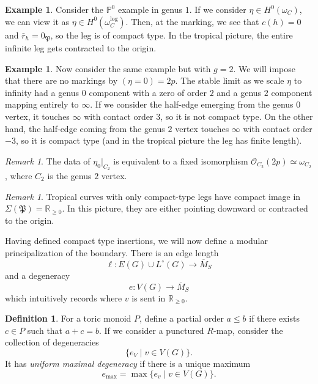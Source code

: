 \documentclass[10pt]{amsart}
\theoremstyle{definition}
\newtheorem{defn}[thm]{Definition}
\newtheorem{exm}[thm]{Example}
\theoremstyle{remark}
\newtheorem{rmk}[thm]{Remark}
\theoremstyle{plain}
\theoremstyle{definition}
\theoremstyle{remark}
\newcommand{\R}{\mathbb{R}}
\renewcommand{\P}{\mathbb{P}}
\newcommand{\mc}[1]{\mathcal{#1}}
\newcommand{\mf}[1]{\mathfrak{#1}}
\newcommand{\ol}[1]{\overline{#1}}
\newcommand{\1}{\mathbf{1}}
\newcommand{\2}{\mathbf{2}}
\newcommand{\3}{\mathbf{3}}
\begin{document}
\begin{exm}
    Consider the $\P^0$ example in genus $1$. If we consider $\eta \in H^0(\omega_C)$, we can view it as $\eta \in H^0(\omega_C^{\log})$. Then, at the marking, we see that $c(h) = 0$ and $\bar{r}_h = 0_{\mf{P}}$, so the leg is of compact type. In the tropical picture, the entire infinite leg gets contracted to the origin.
\end{exm}

\begin{exm}
    Now consider the same example but with $g=2$. We will impose that there are no markings by $(\eta = 0) = 2p$. The stable limit as we scale $\eta$ to infinity had a genus $0$ component with a zero of order $2$ and a genus $2$ component mapping entirely to $\infty$. If we consider the half-edge emerging from the genus $0$ vertex, it touches $\infty$ with contact order $3$, so it is not compact type. On the other hand, the half-edge coming from the genus $2$ vertex touches $\infty$ with contact order $-3$, so it is compact type (and in the tropical picture the leg has finite length).

    \begin{rmk}
        The data of $\eta_0 |_{C_2}$ is equivalent to a fixed isomorphism $\mc{O}_{C_2}(2p) \simeq \omega_{C_2}$, where $C_2$ is the genus $2$ vertex.
    \end{rmk}
\end{exm}

\begin{rmk}
    Tropical curves with only compact-type legs have compact image in $\Sigma(\mf{P}) = \R_{\geq 0}$. In this picture, they are either pointing downward or contracted to the origin.
\end{rmk}

Having defined compact type insertions, we will now define a modular principalization of the boundary. There is an edge length
\[ \ell \colon E(G) \cup L^{\circ}(G) \to \ol{M}_S \]
and a degeneracy
\[ e \colon V(G) \to \ol{M}_S \]
which intuitively records where $v$ is sent in $\R_{\geq 0}$.

\begin{defn}
    For a toric monoid $P$, define a partial order $a \leq b$ if there exists $c \in P$ such that $a+c = b$. If we consider a punctured $R$-map, consider the collection of degeneracies
    \[ \{ e_V \mid v \in V(G)\}. \]
    It has \textit{uniform maximal degeneracy} if there is a unique maximum
    \[ e_{\max} = \max \{e_v \mid v \in V(G)\}. \]
\end{defn}
\end{document}
